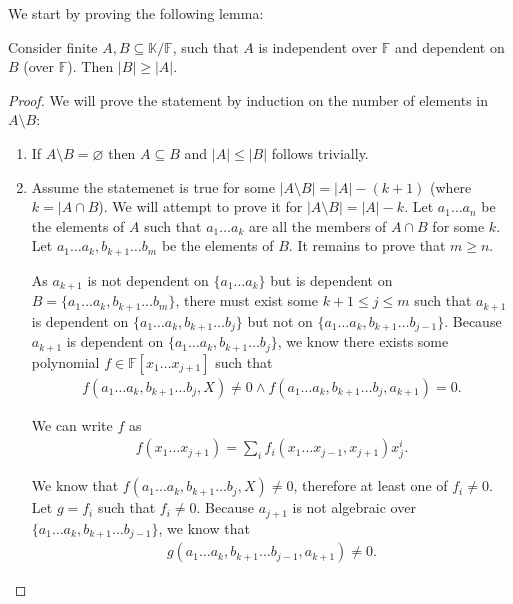 We start by proving the following lemma:
\begin{lemma}\label{lem:algebraic-indep-smaller-than-dep}
	Consider finite $A, B \subseteq \mathbb K / \mathbb F$, such that $A$ is independent over $\mathbb F$ and dependent on $B$ (over $\mathbb F$). Then $|B| \geq |A|$.
\end{lemma}

\begin{proof}
	We will prove the statement by induction on the number of elements in $A \setminus B$:
	\begin{enumerate}
		\item If $A \setminus B = \varnothing $ then $A \subseteq B$ and $|A| \leq |B|$ follows trivially.
		\item Assume the statemenet is true for some $|A \setminus B| = |A| - (k + 1)$ (where $k = |A \cap B$). We will attempt to prove it for $|A \setminus B| = |A| - k$. Let $a _1 \ldots a _n$ be the elements of $A$ such that $a _1 \ldots a_k$ are all the members of $A \cap B$ for some $k$. Let $ a _1 \ldots a_k, b _{k + 1} \ldots b _m$ be the elements of $B$. It remains to prove that $m \geq n$.

		      As $a _{k + 1}$ is not dependent on $\{a _1 \ldots a_k\}$ but is dependent on $B = \{a _1 \ldots a _k, b _{k + 1} \ldots b_m\}$, there must exist some $k + 1 \leq j \leq m$ such that $a _{k + 1}$ is dependent on $\{a _1 \ldots a _k, b _{k + 1} \ldots b_j\}$ but  not on $\{a _1 \ldots a _k, b _{k + 1} \ldots b _{j - 1}\}$. Because $a _{k + 1}$ is dependent on $\{a _1 \ldots a _k, b _{k + 1} \ldots b_j\}$, we know there exists some polynomial $f \in \mathbb F[x _1 \ldots x _{j + 1}]$ such that
		      \begin{align*}
			      f(a _1 \ldots a _{k}, b _{k + 1} \ldots b _{j}, X) \neq  0 \land
			      f(a _1 \ldots a _{k}, b _{k + 1} \ldots b _{j}, a _{k + 1})  = 0.
		      \end{align*}

		      We can write $f$ as
		      \begin{align*}
			      f(x _1 \ldots x _{j + 1})
			      = \sum_i f _i(x _1 \ldots x _{j - 1}, x _{j + 1}) x _j ^i.
		      \end{align*}

		      We know that $f(a _1 \ldots a _{k}, b _{k + 1} \ldots b _{j}, X) \neq  0$, therefore at least one of $f _i \neq 0$. Let $g = f _i $ such that $f _i \neq 0$. Because $a _{j + 1}$ is not algebraic over $\{a _1 \ldots a _k, b _{k + 1} \ldots b _{j - 1}\}$, we know that
		      \begin{align*}
			      g(a _1 \ldots a _k, b _{k + 1} \ldots b _{j - 1}, a _{k + 1}) \neq 0.
		      \end{align*}


\end{enumerate}
\end{proof}
